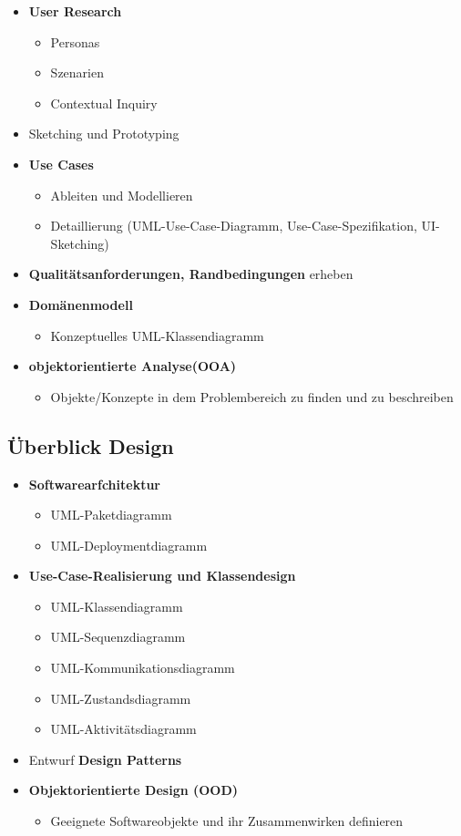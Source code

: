 \documentclass[../ZF_SWEN1.tex]{subfiles}
\begin{document}
\begin{itemize}
	\item \textbf{User Research}
	\begin{itemize}
		\item Personas 
		\item Szenarien
		\item Contextual Inquiry
	\end{itemize}
	\item Sketching und Prototyping
	\item \textbf{Use Cases}
	\begin{itemize}
		\item Ableiten und Modellieren
		\item Detaillierung (UML-Use-Case-Diagramm, Use-Case-Spezifikation, UI-Sketching)
	\end{itemize}
	\item \textbf{Qualitätsanforderungen, Randbedingungen} erheben
	\item \textbf{Domänenmodell}
	\begin{itemize}
		\item Konzeptuelles UML-Klassendiagramm 
	\end{itemize}
	\item \textbf{objektorientierte Analyse(OOA)} 
	\begin{itemize}
		\item Objekte/Konzepte in dem Problembereich zu finden und zu beschreiben
	\end{itemize}
\end{itemize}

\subsection{Überblick Design}
\begin{itemize}
	\item \textbf{Softwarearfchitektur}
	\begin{itemize}
		\item UML-Paketdiagramm
		\item UML-Deploymentdiagramm
	\end{itemize}
	\item \textbf {Use-Case-Realisierung und Klassendesign}
	\begin{itemize}
		\item UML-Klassendiagramm
		\item UML-Sequenzdiagramm
		\item UML-Kommunikationsdiagramm
		\item UML-Zustandsdiagramm
		\item UML-Aktivitätsdiagramm
	\end{itemize}
	\item Entwurf \textbf{Design Patterns}
	\item \textbf{Objektorientierte Design (OOD)}
	\begin{itemize}
		\item Geeignete Softwareobjekte und ihr Zusammenwirken definieren
	\end{itemize}
\end{itemize}
\end{document}
